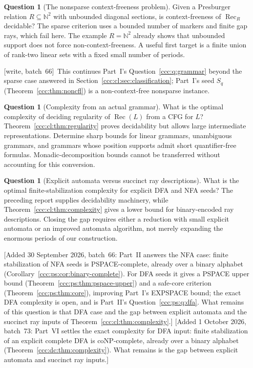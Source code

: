 \documentclass[11pt,letterpaper]{article}
\theoremstyle{definition}
\newtheorem{question}[theorem]{Question}
\theoremstyle{remark}
\newcommand{\N}{\mathbb N}
\newcommand{\rec}{\operatorname{Rec}}
\newcommand{\wsix}{\textup{[write, batch~66]}}
\newcommand{\wadd}[1]{\textup{[}Added 30 September 2026, batch~66: #1\textup{]}}
\newcommand{\waddsevthree}[1]{\textup{[}Added 1 October 2026, batch~73: #1\textup{]}}
\begin{document}
\begin{question}[The nonsparse context-freeness problem]\label{ccc:cl:q:nonsparse}
Given a Presburger relation $R\subseteq\N^2$ with unbounded diagonal
sections, is context-freeness of $\rec_R$ decidable? The sparse criterion
uses a bounded number of markers and finite gap rays, which fail here.
The example $R=\N^2$ already shows that unbounded support does not force
non-context-freeness. A useful first target is a finite union of
rank-two linear sets with a fixed small number of periods.
\end{question}
\wsix\ This continues Part~I's Question~\ref{ccc:q:grammar} beyond the
sparse case answered in Section~\ref{ccc:cl:sec:classification}; Part~I's
seed $S_q$ (Theorem~\ref{ccc:thm:noncfl}) is a non-context-free nonsparse
instance.

\begin{question}[Complexity from an actual grammar]\label{ccc:cl:q:grammarcomplexity}
What is the optimal complexity of deciding regularity of $\rec(L)$ from
a CFG for $L$? Theorem~\ref{ccc:cl:thm:regularity} proves decidability but
allows large intermediate representations. Determine sharp bounds for
linear grammars, unambiguous grammars, and grammars whose position
supports admit short quantifier-free formulas. Monadic-decomposition
bounds cannot be transferred without accounting for this conversion.
\end{question}

\begin{question}[Explicit automata versus succinct ray descriptions]\label{ccc:cl:q:explicit}
What is the optimal finite-stabilization complexity for explicit DFA
and NFA seeds? The preceding report supplies decidability machinery,
while Theorem~\ref{ccc:cl:thm:complexity} gives a lower bound for binary-encoded
ray descriptions. Closing the gap requires either a reduction with
small explicit automata or an improved automata algorithm, not merely
expanding the enormous periods of our construction.
\end{question}
\wadd{Part~II answers the NFA case: finite stabilization of NFA seeds is
PSPACE-complete, already over a binary alphabet
(Corollary~\ref{ccc:ps:cor:binary-complete}). For DFA seeds it gives a PSPACE
upper bound (Theorem~\ref{ccc:ps:thm:pspace-upper}) and a safe-core criterion
(Theorem~\ref{ccc:ps:thm:core}), improving Part~I's EXPSPACE bound; the exact
DFA complexity is open, and is Part~II's Question~\ref{ccc:ps:q:dfa}. What
remains of this question is that DFA case and the gap between explicit
automata and the succinct ray inputs of Theorem~\ref{ccc:cl:thm:complexity}.}
\waddsevthree{Part~VI settles the exact complexity for DFA input: finite stabilization of an explicit complete DFA is coNP-complete, already over a binary alphabet (Theorem~\ref{ccc:dc:thm:complexity}). What remains is the gap between explicit
automata and succinct ray inputs.}
\end{document}
